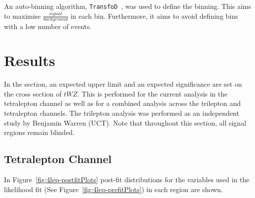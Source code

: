 An auto-binning algorithm, \texttt{TransfoD}~\cite{transfod-autobin}, was used to define the binning. This aims to maximise $\frac{signal}{background}$ in each bin. Furthermore, it aims to avoid defining bins with a low number of events.

\section{Results}

In the section, an expected upper limit and an expected significance are set on the cross section of $tWZ$. This is performed for the current analysis in the tetralepton channel as well as for a combined analysis across the trilepton and tetralepton channels. The trilepton analysis was performed as an independent study by Benjamin Warren (UCT). Note that throughout this section, all signal regions remain blinded.

\subsection{Tetralepton Channel}
In Figure~\ref{fig:4lep-postfitPlots} post-fit distributions for the variables used in the likelihood fit (See Figure~\ref{fig:4lep-prefitPlots}) in each region are shown.

